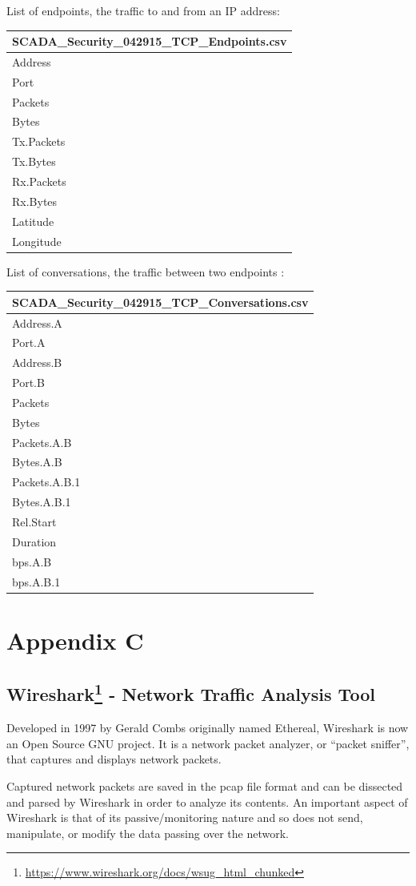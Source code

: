 \documentclass[11pt,]{article}
\let\rmarkdownfootnote\footnote%
\def\footnote{\protect\rmarkdownfootnote}
\begin{document}
List of endpoints, the traffic to and from an IP address:

\begin{longtable}[c]{@{}l@{}}
\toprule
SCADA\_Security\_042915\_TCP\_Endpoints.csv\tabularnewline
\midrule
\endhead
Address\tabularnewline
Port\tabularnewline
Packets\tabularnewline
Bytes\tabularnewline
Tx.Packets\tabularnewline
Tx.Bytes\tabularnewline
Rx.Packets\tabularnewline
Rx.Bytes\tabularnewline
Latitude\tabularnewline
Longitude\tabularnewline
\bottomrule
\end{longtable}

List of conversations, the traffic between two endpoints :

\begin{longtable}[c]{@{}l@{}}
\toprule
SCADA\_Security\_042915\_TCP\_Conversations.csv\tabularnewline
\midrule
\endhead
Address.A\tabularnewline
Port.A\tabularnewline
Address.B\tabularnewline
Port.B\tabularnewline
Packets\tabularnewline
Bytes\tabularnewline
Packets.A.B\tabularnewline
Bytes.A.B\tabularnewline
Packets.A.B.1\tabularnewline
Bytes.A.B.1\tabularnewline
Rel.Start\tabularnewline
Duration\tabularnewline
bps.A.B\tabularnewline
bps.A.B.1\tabularnewline
\bottomrule
\end{longtable}

\newpage

\section*{Appendix C}\label{appendix-c}

\subsection[Wireshark - Network Traffic Analysis
Tool]{Wireshark\footnote{\url{https://www.wireshark.org/docs/wsug_html_chunked}}
- Network Traffic Analysis
Tool}\label{wireshark4---network-traffic-analysis-tool}

Developed in 1997 by Gerald Combs originally named Ethereal, Wireshark
is now an Open Source GNU project. It is a network packet analyzer, or
``packet sniffer'', that captures and displays network packets.

Captured network packets are saved in the pcap file format and can be
dissected and parsed by Wireshark in order to analyze its contents. An
important aspect of Wireshark is that of its passive/monitoring nature
and so does not send, manipulate, or modify the data passing over the
network.
\end{document}

